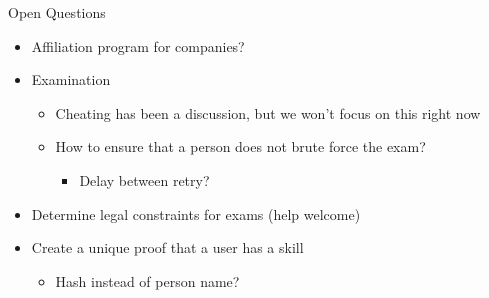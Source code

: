 \documentclass[compress,aspectratio=169]{beamer}
\begin{document}
\begin{frame}{Open Questions}
	\begin{itemize}
		\item Affiliation program for companies?
		\item Examination
			\begin{itemize}
				\item Cheating has been a discussion, but we won't focus on this right now
				\item How to ensure that a person does not brute force the exam?
				\begin{itemize}
					\item Delay between retry?
				\end{itemize}
			\end{itemize}
		\item Determine legal constraints for exams (help welcome)
		\item Create a unique proof that a user has a skill
		 	\begin{itemize}
		 		\item Hash instead of person name?
		 	\end{itemize}
	\end{itemize}
\end{frame}
\end{document}
